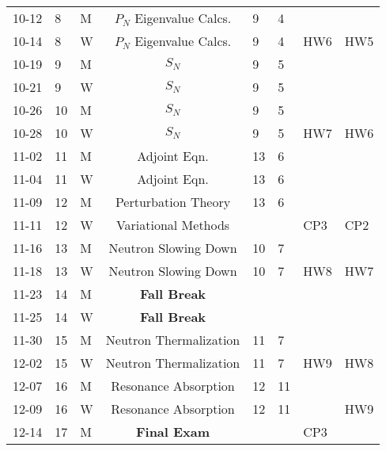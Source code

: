 \documentclass[11pt, a4paper]{article}
\begin{document}
\begin{table}[h]
\begin{center}
\begin{tabular}{lllcllll}
10-12 & 8 & M & $P_N$ Eigenvalue Calcs.& 9 & 4 &  &   \\
10-14 & 8 & W & $P_N$ Eigenvalue Calcs. & 9 & 4 & HW6 & HW5\\
10-19 & 9 & M & $S_N$ & 9 & 5 &  & \\
10-21 & 9 & W & $S_N$ & 9 & 5 &  & \\
10-26 & 10 & M & $S_N$ & 9 & 5 &     &    \\
10-28 & 10 & W & $S_N$ & 9 & 5 & HW7 & HW6 \\
11-02 & 11 & M & Adjoint Eqn. & 13 & 6 &  & \\
11-04 & 11 & W & Adjoint Eqn. & 13 & 6 &  & \\
11-09 & 12 & M & Perturbation Theory & 13 & 6 & & \\
11-11 & 12 & W & Variational Methods &  &  & CP3 & CP2\\
11-16 & 13 & M & Neutron Slowing Down & 10 &7 &  & \\
11-18 & 13 & W & Neutron Slowing Down & 10 & 7 & HW8 & HW7\\
11-23 & 14 & M & \textbf{Fall Break} &  &  &  & \\
11-25 & 14 & W & \textbf{Fall Break} &  &  &  &  \\
11-30 & 15 & M & Neutron Thermalization &  11 & 7 &  & \\
12-02 & 15 & W & Neutron Thermalization & 11 & 7 & HW9 & HW8\\
12-07 & 16 & M & Resonance Absorption & 12 & 11 &  & \\
12-09 & 16 & W & Resonance Absorption & 12 & 11 &  & HW9 \\
12-14 & 17 & M & \textbf{Final Exam} &  &  & CP3 & \\
\end{tabular}
\end{center}
\end{table}
\end{document}
